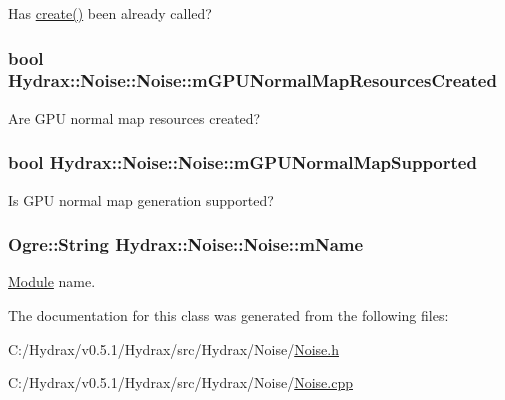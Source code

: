 Has \hyperlink{class_hydrax_1_1_noise_1_1_noise_be9cf8765feed765e6a35b0779125f6a}{create()} been already called? 

\hypertarget{class_hydrax_1_1_noise_1_1_noise_8c140b20c56920d4dd99204dff093ac2}{
\subsubsection[{mGPUNormalMapResourcesCreated}]{\setlength{\rightskip}{0pt plus 5cm}bool {\bf Hydrax::Noise::Noise::mGPUNormalMapResourcesCreated}}}
\label{class_hydrax_1_1_noise_1_1_noise_8c140b20c56920d4dd99204dff093ac2}


Are GPU normal map resources created? 

\hypertarget{class_hydrax_1_1_noise_1_1_noise_ce28ba855518ef99599c1ac4a7512446}{
\subsubsection[{mGPUNormalMapSupported}]{\setlength{\rightskip}{0pt plus 5cm}bool {\bf Hydrax::Noise::Noise::mGPUNormalMapSupported}}}
\label{class_hydrax_1_1_noise_1_1_noise_ce28ba855518ef99599c1ac4a7512446}


Is GPU normal map generation supported? 

\hypertarget{class_hydrax_1_1_noise_1_1_noise_aedee8210b700f1ee80c660a38973b14}{
\subsubsection[{mName}]{\setlength{\rightskip}{0pt plus 5cm}Ogre::String {\bf Hydrax::Noise::Noise::mName}}}
\label{class_hydrax_1_1_noise_1_1_noise_aedee8210b700f1ee80c660a38973b14}


\hyperlink{namespace_hydrax_1_1_module}{Module} name. 



The documentation for this class was generated from the following files:\begin{CompactItemize}
\item 
C:/Hydrax/v0.5.1/Hydrax/src/Hydrax/Noise/\hyperlink{_noise_8h}{Noise.h}\item 
C:/Hydrax/v0.5.1/Hydrax/src/Hydrax/Noise/\hyperlink{_noise_8cpp}{Noise.cpp}\end{CompactItemize}

